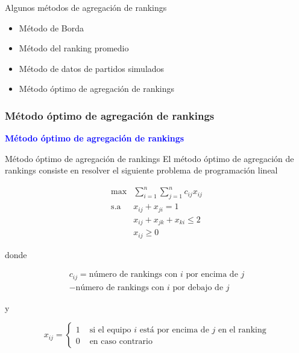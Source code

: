 \documentclass[10pt,hyperref={unicode}]{beamer}
\begin{document}
	
	\begin{frame}{Algunos métodos de agregación de rankings}
	\begin{itemize}
		\item Método de Borda
		\item Método del ranking promedio
		\item Método de datos de partidos simulados
		\item Método óptimo de agregación de rankings
	\end{itemize}
	\end{frame}
	
	\subsubsection*{Método óptimo de agregación de rankings}
	
	\begin{frame}
		\begin{center}
			\Huge\textbf{\textsf{\textcolor{blue}{Método óptimo de agregación de rankings}}}
		\end{center}
	\end{frame}
	
	\begin{frame}{Método óptimo de agregación de rankings}
		El método óptimo de agregación de rankings consiste en resolver el siguiente problema de programación lineal
		
		 \begin{equation}
		 \begin{array}{rl}
		 \max         & \sum\limits_{i=1}^{n} \sum\limits_{j=1}^{n} c_{ij} x_{ij}\\
		 \mathrm{s.a} & x_{ij} + x_{ji} = 1\\
		 & x_{ij} + x_{jk} + x_{ki} \leq 2\\
		 & x_{ij} \geq 0
		 \end{array}
		 \end{equation}
		 
		 donde 
		 
		 \begin{multline} \label{eq:conformidad}
		 c_{ij} = \text{número de rankings con $i$ por encima de $j$} \\ - \text{número de rankings con $i$ por debajo de $j$}
		 \end{multline}
		 
		 y
		 
		 \begin{equation}
		 x_{ij} = \begin{cases}
		 1 & \text{ si el equipo $i$ está por encima de $j$ en el ranking}\\
		 0 & \text{ en caso contrario}
		 \end{cases}
		 \end{equation}
	\end{frame}
	
\end{document}
